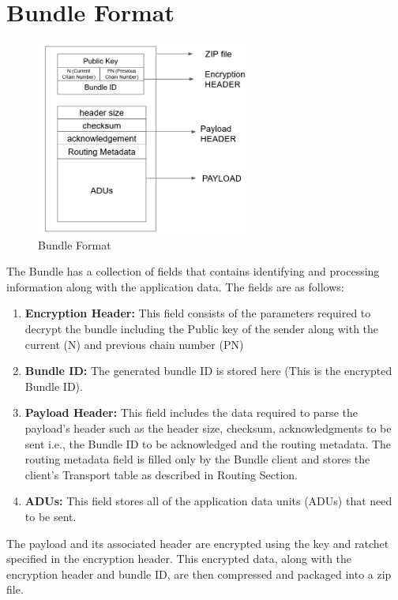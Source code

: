 \section{Bundle Format}
\begin{figure}[ht!]
\centering
\includegraphics[width= 70mm]{./images/Bundle Header.png}
\caption{Bundle Format}
\end{figure}

The Bundle has a collection of fields that contains identifying and processing information along with the application data. The fields are as follows:
\begin{enumerate}
    \item \textbf{Encryption Header:} This field consists of the parameters required to decrypt the bundle including the Public key of the sender along with the current (N) and previous chain number (PN)
    \item \textbf{Bundle ID:} The generated bundle ID is stored here (This is the encrypted Bundle ID).
    \item \textbf{Payload Header:} This field includes the data required to parse the payload's header such as the header size, checksum, acknowledgments to be sent i.e., the Bundle ID to be acknowledged and the routing metadata. The routing metadata field is filled only by the Bundle client and stores the client's Transport table as described in Routing Section.
    \item \textbf{ADUs:} This field stores all of the application data units (ADUs) that need to be sent.
\end{enumerate}

The payload and its associated header are encrypted using the key and ratchet specified in the encryption header. This encrypted data, along with the encryption header and bundle ID, are then compressed and packaged into a zip file.

